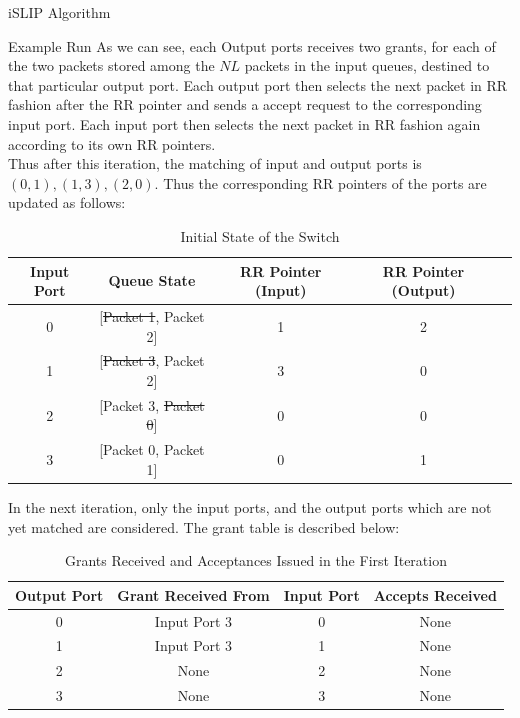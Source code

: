 \begin{section}{iSLIP Algorithm \cite{769767}}
\begin{subsection}{Example Run}
        As we can see, each Output ports receives two grants, for each of the two packets stored among the $NL$ packets in the input queues, destined to that particular output port. Each output port then selects the next packet in RR fashion after the RR pointer and sends a accept request to the corresponding input port. Each input port then selects the next packet in RR fashion again according to its own RR pointers. \\
        Thus after this iteration, the matching of input and output ports is ${(0, 1), (1, 3), (2, 0)}$. Thus the corresponding RR pointers of the ports are updated as follows:

        \begin{table}[h!]
            \centering
            \caption{Initial State of the Switch}
            \begin{tabular}{|c|c|c|c|c|}
                \hline
                \textbf{Input Port} & \textbf{Queue State} & \textbf{RR Pointer (Input)} & \textbf{RR Pointer (Output)} \\ \hline
                0 & [\sout{Packet 1}, Packet 2] & 1 & 2 \\ \hline
                1 & [\sout{Packet 3}, Packet 2] & 3 & 0 \\ \hline
                2 & [Packet 3, \sout{Packet 0}] & 0 & 0 \\ \hline
                3 & [Packet 0, Packet 1] & 0 & 1 \\ \hline
            \end{tabular}
            \label{tab:switch_state}
        \end{table}

        In the next iteration, only the input ports, and the output ports which are not yet matched are considered. The grant table is described below:


        \begin{table}[h!]
            \centering
            \caption{Grants Received and Acceptances Issued in the First Iteration}
            \begin{tabular}{|c|c|c|c|}
                \hline
                \textbf{Output Port} & \textbf{Grant Received From} & \textbf{Input Port} & \textbf{Accepts Received} \\ \hline
                0 & Input Port 3 & 0 & None \\ \hline
                1 & Input Port 3 & 1 & None\\ \hline
                2 & None & 2 & None \\ \hline
                3 & None & 3 & None \\ \hline
            \end{tabular}
            \label{tab:grants_acceptances}
        \end{table}


\end{subsection}
\end{section}
